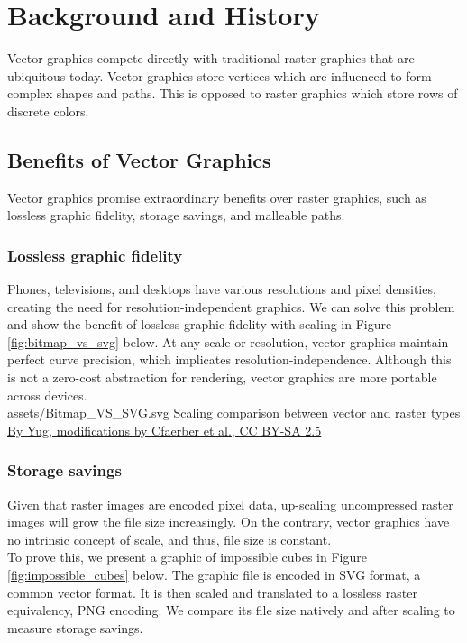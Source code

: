 \section{Background and History}
Vector graphics compete directly with traditional raster graphics that are ubiquitous today. Vector graphics store vertices which are influenced to form complex shapes and paths. This is opposed to raster graphics which store rows of discrete colors.\\

\subsection{Benefits of Vector Graphics}
Vector graphics promise extraordinary benefits over raster graphics, such as lossless graphic fidelity, storage savings, and malleable paths.\\

\subsubsection{Lossless graphic fidelity}
Phones, televisions, and desktops have various resolutions and pixel densities, creating the need for resolution-independent graphics. We can solve this problem and show the benefit of lossless graphic fidelity with scaling in Figure \ref{fig:bitmap_vs_svg} below. At any scale or resolution, vector graphics maintain perfect curve precision, which implicates resolution-independence. Although this is not a zero-cost abstraction for rendering, vector graphics are more portable across devices.\\

\svg
{assets/Bitmap_VS_SVG.svg}
{\label{fig:bitmap_vs_svg}Scaling comparison between vector and raster types}
{\href{https://commons.wikimedia.org/w/index.php?curid=1183592}{By Yug, modifications by Cfaerber et al., CC BY-SA 2.5}}

\subsubsection{Storage savings}
Given that raster images are encoded pixel data, up-scaling uncompressed raster images will grow the file size increasingly. On the contrary, vector graphics have no intrinsic concept of scale, and thus, file size is constant.\\

To prove this, we present a graphic of impossible cubes in Figure \ref{fig:impossible_cubes} below. The graphic file is encoded in SVG format, a common vector format. It is then scaled and translated to a lossless raster equivalency, PNG encoding. We compare its file size natively and after scaling to measure storage savings.\\

